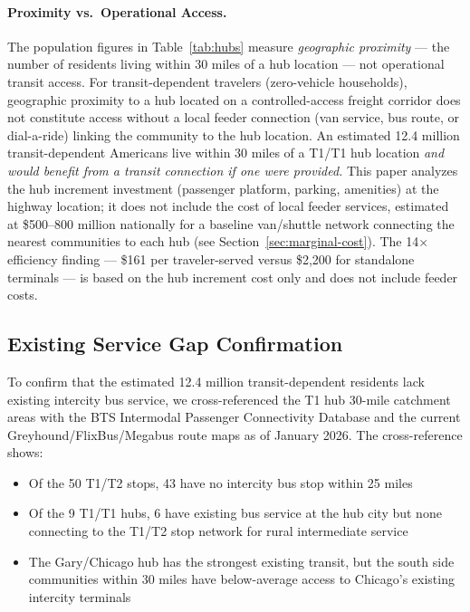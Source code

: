 \paragraph{Proximity vs.\ Operational Access.}
The population figures in Table~\ref{tab:hubs} measure \textit{geographic proximity} ---
the number of residents living within 30 miles of a hub location --- not operational transit
access. For transit-dependent travelers (zero-vehicle households), geographic proximity to a
hub located on a controlled-access freight corridor does not constitute access without a local
feeder connection (van service, bus route, or dial-a-ride) linking the community to the hub
location. An estimated 12.4 million transit-dependent Americans live within 30 miles of a
T1/T1 hub location \textit{and would benefit from a transit connection if one were provided.}
This paper analyzes the hub increment investment (passenger platform, parking, amenities) at
the highway location; it does not include the cost of local feeder services, estimated at
\$500--800 million nationally for a baseline van/shuttle network connecting the nearest
communities to each hub (see Section~\ref{sec:marginal-cost}). The 14$\times$ efficiency
finding --- \$161 per traveler-served versus \$2{,}200 for standalone terminals --- is based
on the hub increment cost only and does not include feeder costs.

\subsection{Existing Service Gap Confirmation}

To confirm that the estimated 12.4 million transit-dependent residents lack existing intercity bus service, we cross-referenced the T1 hub 30-mile catchment areas with the BTS Intermodal Passenger Connectivity Database \citep{BTS_intermodal2023} and the current Greyhound/FlixBus/Megabus route maps as of January 2026. The cross-reference shows:
\begin{itemize}
  \item Of the 50 T1/T2 stops, 43 have no intercity bus stop within 25 miles
  \item Of the 9 T1/T1 hubs, 6 have existing bus service at the hub city but none connecting to the T1/T2 stop network for rural intermediate service
  \item The Gary/Chicago hub has the strongest existing transit, but the south side communities within 30 miles have below-average access to Chicago's existing intercity terminals
\end{itemize}

